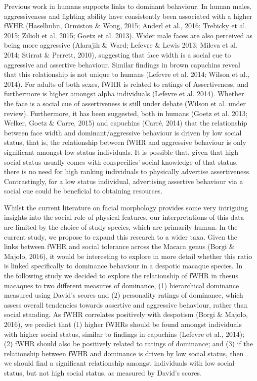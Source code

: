 \documentclass[english,man]{apa6}
\theoremstyle{definition}
\theoremstyle{definition}
\theoremstyle{remark}
\begin{document}
Previous work in humans supports links to dominant behaviour. In human
males, aggressiveness and fighting ability have consistently been
associated with a higher fWHR (Haselhuhn, Ormiston \& Wong, 2015; Anderl
et al., 2016; Trebicky et al. 2015; Zilioli et al. 2015; Goetz et al.
2013). Wider male faces are also perceived as being more aggressive
(Alarajih \& Ward; Lefevre \& Lewis 2013; Mileva et al. 2014; Stirrat \&
Perrett, 2010), suggesting that face width is a social cue to aggressive
and assertive behaviour. Similar findings in brown capuchins reveal that
this relationship is not unique to humans (Lefevre et al. 2014; Wilson
et al., 2014). For adults of both sexes, fWHR is related to ratings of
Assertiveness, and furthermore is higher amongst alpha individuals
(Lefevre et al. 2014). Whether the face is a social cue of assertiveness
is still under debate (Wilson et al. under review). Furthermore, it has
been suggested, both in humans (Goetz et al. 2013; Welker, Goetz \&
Carre, 2015) and capuchins (Carré, 2014) that the relationship between
face width and dominant/aggressive behaviour is driven by low social
status, that is, the relationship between fWHR and aggressive behaviour
is only significant amongst low-status individuals. It is possible that,
given that high social status usually comes with conspecifics' social
knowledge of that status, there is no need for high ranking individuals
to physically advertise assertiveness. Contrastingly, for a low status
individual, advertising assertive behaviour via a social cue could be
beneficial to obtaining resources.

Whilst the current literature on facial morphology provides some very
intriguing insights into the social role of physical features, our
interpretations of this data are limited by the choice of study species,
which are primarily human. In the current study, we propose to expand
this research to a wider taxa. Given the links between fWHR and social
tolerance across the Macaca genus (Borgi \& Majolo, 2016), it would be
interesting to explore in more detail whether this ratio is linked
specifically to dominance behaviour in a despotic macaque species. In
the following study we decided to explore the relationship of fWHR in
rhesus macaques to two different measures of dominance, (1) hierarchical
dominance measured using David's scores and (2) personality ratings of
dominance, which assess overall tendencies towards assertive and
aggressive behaviour, rather than social standing. As fWHR correlates
positively with despotism (Borgi \& Majolo, 2016), we predict that (1)
higher fWHRs should be found amongst individuals with higher social
status, similar to findings in capuchins (Lefevre et al., 2014); (2)
fWHR should also be positively related to ratings of dominance; and (3)
if the relationship between fWHR and dominance is driven by low social
status, then we should find a significant relationship amongst
individuals with low social status, but not high social status, as
measured by David's scores.
\end{document}
